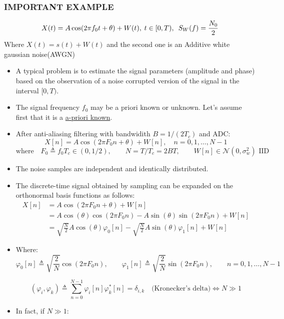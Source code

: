 \subsubsection{IMPORTANT EXAMPLE}
\[
X(t)=A\cos(2\pi f_0t+\theta)+W(t),\hspace{0.25em}t\in[0,T),\hspace{0.5em}S_W(f)=\frac{N_0}{2}
\]
\noindent Where \(X(t)=s(t)+W(t)\) and the second one is an Additive white gaussian noise(AWGN)
\begin{itemize}
    \item A typical problem is to estimate the signal parameters (amplitude and phase) based on the observation of a noise corrupted version of the signal in the interval \([0,T)\).
    \item The signal frequency \(f_0\) may be a priori known or unknown. Let's assume first that it is a \underline{a-priori known}.
    \item After anti-aliasing filtering with bandwidith \(B=1/(2T_c)\) and ADC:
    \[
X[n] = A \cos \left( 2\pi F_0 n + \theta \right) + W[n], \quad n = 0, 1, \ldots, N-1
\]
\[
\text{where} \quad
F_0 \triangleq f_0 T_c \in (0, 1/2), \qquad
N = T/T_c = 2BT, \qquad
W[n] \in \mathcal{N}\left(0, \sigma_w^2 \right) \text{ IID}
\]
   \item The noise samples are independent and identically distributed.
   \item The discrete-time signal obtained by sampling can be expanded on the orthonormal basis functions as follows:
   \[
\begin{aligned}
X[n] &= A \cos \left( 2\pi F_0 n + \theta \right) + W[n] \\
     &= A \cos(\theta) \cos(2\pi F_0 n) - A \sin(\theta) \sin(2\pi F_0 n) + W[n] \\
     &= \sqrt{\frac{N}{2}} A \cos(\theta) \varphi_0[n]
        - \sqrt{\frac{N}{2}} A \sin(\theta) \varphi_1[n]
        + W[n]
\end{aligned}
\]
   \item Where:
   \[
\varphi_0[n] \triangleq \sqrt{\frac{2}{N}}\cos(2\pi F_0 n), \qquad
\varphi_1[n] \triangleq \sqrt{\frac{2}{N}}\sin(2\pi F_0 n), \qquad n=0,1,\ldots,N-1
\]

\[
(\varphi_i, \varphi_k) \triangleq \sum_{n=0}^{N-1} \varphi_i[n]\varphi_k^*[n] = \delta_{i,k} \quad \text{(Kronecker's delta)} \iff N \gg 1
\]

   \item In fact, if \(N\gg 1\):
   

\end{itemize}
